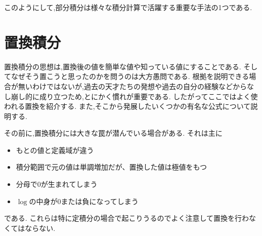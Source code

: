 ﻿\documentclass[dvipdfmx,a4paper,11pt,fleqn]{jsarticle}
\begin{document}
このようにして,部分積分は様々な積分計算で活躍する重要な手法の1つである.

\section{置換積分}
置換積分の思想は,置換後の値を簡単な値や知っている値にすることである.
そしてなぜそう置こうと思ったのかを問うのは大方愚問である.
根拠を説明できる場合が無いわけではないが,過去の天才たちの発想や過去の自分の経験などからなし崩し的に成り立つため,とにかく慣れが重要である.
したがってここではよく使われる置換を紹介する.
また,そこから発展したいくつかの有名な公式について説明する.

その前に,置換積分には大きな罠が潜んでいる場合がある.
それは主に
\begin{itemize}
  \item もとの値と定義域が違う
  \item 積分範囲で元の値は単調増加だが、置換した値は極値をもつ
  \item 分母で0が生まれてしまう
  \item $\log$の中身が0または負になってしまう
\end{itemize}
である.
これらは特に定積分の場合で起こりうるのでよく注意して置換を行わなくてはならない.
\end{document}
